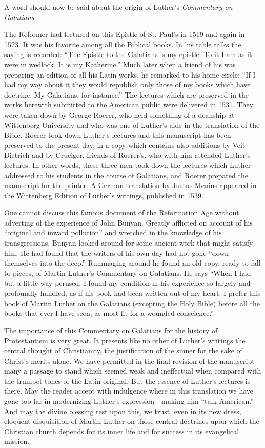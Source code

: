 A word should now be said about the origin of Luther’s \emph{Commentary on Galatians}.

The Reformer had lectured on this Epistle of St. Paul’s in 1519 and again in 1523. It was his favorite among all the Biblical books. In his table talks the saying is recorded: “The Epistle to the Galatians is my epistle. To it I am as it were in wedlock. It is my Katherine.” Much later when a friend of his was preparing an edition of all his Latin works, he remarked to his home circle: “If I had my way about it they would republish only those of my books which have doctrine. My Galatians, for instance.” The lectures which are preserved in the works herewith submitted to the American public were delivered in 1531. They were taken down by George Roerer, who held something of a deanship at Wittenberg University and who was one of Luther’s aids in the translation of the Bible. Roerer took down Luther’s lectures and this manuscript has been preserved to the present day, in a copy which contains also additions by Veit Dietrich and by Cruciger, friends of Roerer’s, who with him attended Luther’s lectures. In other words, these three men took down the lectures which Luther addressed to his students in the course of Galatians, and Roerer prepared the manuscript for the printer. A German translation by Justus Menius appeared in the Wittenberg Edition of Luther’s writings, published in 1539.

One cannot discuss this famous document of the Reformation Age without adverting of the experience of John Bunyan. Greatly afflicted on account of his “original and inward pollution” and wretched in the knowledge of his transgressions, Bunyan looked around for some ancient work that might satisfy him. He had found that the writers of his own day had not gone “down themselves into the deep.” Rummaging around he found an old copy, ready to fall to pieces, of Martin Luther’s Commentary on Galatians. He says “When I had but a little way perused, I found my condition in his experience so largely and profoundly handled, as if his book had been written out of my heart. I prefer this book of Martin Luther on the Galatians (excepting the Holy Bible) before all the books that ever I have seen, as most fit for a wounded conscience.”

The importance of this Commentary on Galatians for the history of Protestantism is very great. It presents like no other of Luther’s writings the central thought of Christianity, the justification of the sinner for the sake of Christ’s merits alone. We have permitted in the final revision of the manuscript many a passage to stand which seemed weak and ineffectual when compared with the trumpet tones of the Latin original. But the essence of Luther’s lectures is there. May the reader accept with indulgence where in this translation we have gone too far in modernizing Luther’s expression—making him “talk American.” And may the divine blessing rest upon this, we trust, even in its new dress, eloquent disquisition of Martin Luther on those central doctrines upon which the Christian church depends for its inner life and for success in its evangelical mission.

